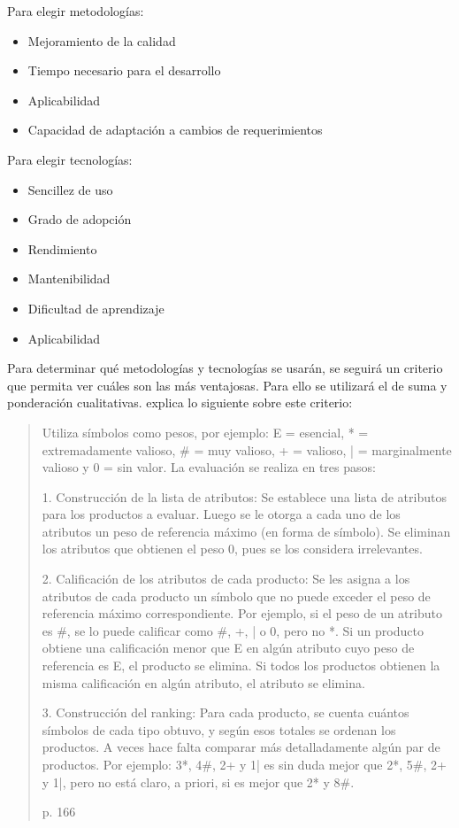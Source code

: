 \documentclass[twoside]{article}
\begin{document}
Para elegir metodologías:
\begin{itemize}
    \item Mejoramiento de la calidad
    \item Tiempo necesario para el desarrollo
    \item Aplicabilidad
    \item Capacidad de adaptación a cambios de requerimientos
\end{itemize}
Para elegir tecnologías:
\begin{itemize}
    \item Sencillez de uso
    \item Grado de adopción
    \item Rendimiento
    \item Mantenibilidad
    \item Dificultad de aprendizaje
    \item Aplicabilidad
\end{itemize}
Para determinar qué metodologías y tecnologías se usarán, se seguirá un criterio que permita ver cuáles son las más ventajosas. Para ello se utilizará el de suma y ponderación cualitativas. \textcite{scriven} explica lo siguiente sobre este criterio: 
\blockquote[p. 166]{Utiliza símbolos como pesos, por ejemplo: E = esencial, * = extremadamente valioso, \# = muy valioso, + = valioso, | = marginalmente valioso y 
0 = sin valor. La evaluación se realiza en tres pasos: 

1. Construcción de la lista de atributos: Se establece una lista de atributos para los 
productos a evaluar. Luego se le otorga a cada uno de los atributos un peso de 
referencia máximo (en forma de símbolo). Se eliminan los atributos que obtienen el 
peso 0, pues se los considera irrelevantes. 

2. Calificación de los atributos de cada producto: Se les asigna a los atributos de cada 
producto un símbolo que no puede exceder el peso de referencia máximo 
 correspondiente. Por ejemplo, si el peso de un atributo es \#, se lo puede calificar como 
\#, +, | o 0, pero no *. Si un producto obtiene una calificación menor que E en algún 
atributo cuyo peso de referencia es E, el producto se elimina. Si todos los productos 
obtienen la misma calificación en algún atributo, el atributo se elimina. 

3. Construcción del ranking: Para cada producto, se cuenta cuántos símbolos de cada 
tipo obtuvo, y según esos totales se ordenan los productos. A veces hace falta 
comparar más detalladamente algún par de productos. Por ejemplo: 3*, 4\#, 2+ y 1| es 
sin duda mejor que 2*, 5\#, 2+ y 1|, pero no está claro, a priori, si es mejor que 2* y 8\#. }
\end{document}
